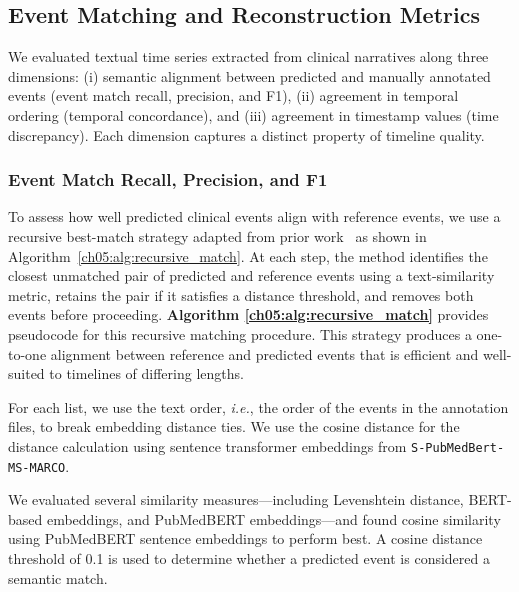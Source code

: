 \subsection{Event Matching and Reconstruction Metrics}
\label{ch05:apd:evaluation-metrics}

We evaluated textual time series extracted from clinical narratives along three dimensions:
(i) semantic alignment between predicted and manually annotated events (event match recall, precision, and F1),
(ii) agreement in temporal ordering (temporal concordance), and
(iii) agreement in timestamp values (time discrepancy).
Each dimension captures a distinct property of timeline quality.

\subsubsection{Event Match Recall, Precision, and F1}\label{ch05:apd:event-match-rate}\label{ch06:apd:pseudo}

To assess how well predicted clinical events align with reference events, we use a recursive
best-match strategy adapted from prior work~\cite{wang2025large} as shown in Algorithm~\ref{ch05:alg:recursive_match}.
At each step, the method
identifies the closest unmatched pair of predicted and reference events using a text-similarity
metric, retains the pair if it satisfies a distance threshold, and removes both events before
proceeding. \textbf{Algorithm \ref{ch05:alg:recursive_match}} provides pseudocode for this recursive matching procedure.
This strategy produces a one-to-one alignment between reference and predicted events that is
efficient and well-suited to timelines of differing lengths. 

For each list, we use the text order, \emph{i.e.}, the order of the events in the annotation files, to break embedding distance ties.
We use the cosine distance for the distance calculation using sentence transformer embeddings from \texttt{S-PubMedBert-MS-MARCO}.

We evaluated several similarity measures—including Levenshtein distance, BERT-based
embeddings, and PubMedBERT embeddings—and found cosine similarity using PubMedBERT
sentence embeddings to perform best. A cosine distance threshold of 0.1 is used to determine
whether a predicted event is considered a semantic match.


